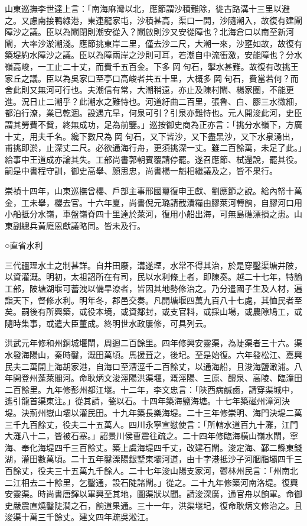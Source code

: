 山東巡撫李世達上言：「南海麻灣以北，應節謂沙積難除，徙古路溝十三里以避之。又慮南接鴨綠港，東連龍家屯，沙積甚高，渠口一開，沙隨潮入，故復有建閘障沙之議。臣以為閘閉則潮安從入？閘啟則沙又安從障也？北海倉口以南至新河閘，大率沙淤潮淺。應節挑東岸二里，僅去沙二尺，大潮一來，沙壅如故，故復有築堤約水障沙之議。臣以為障兩岸之沙則可耳，若潮自中流衝激，安能障也？分水嶺高峻，一工止二十丈，而費千五百金。下多岡句石，掣水甚難。故復有改挑王家丘之議。臣以為吳家口至亭口高峻者共五十里，大概多岡句石，費當若何？而舍此則又無河可行也。夫潮信有常，大潮稍遠，亦止及陳村閘、楊家圈，不能更進。況日止二潮乎？此潮水之難恃也。河道紆曲二百里，張魯、白、膠三水微細，都泊行潦，業已乾涸。設遇亢旱，何泉可引？引泉亦難恃也。元人開浚此河，史臣謂其勞費不貲，終無成功，足為前鑒。」巡按御史商為正亦言：「挑分水嶺下，方廣十丈，用夫千名。纔下數尺為岡句石，又下皆沙，又下盡黑沙，又下水泉湧出，甫挑即淤，止深丈二尺。必欲通海行舟，更須挑深一丈。雖二百餘萬，未足了此。」給事中王道成亦論其失。工部尚書郭朝賓覆請停罷。遂召應節、栻還說，罷其役。嗣是中書程守訓，御史高舉、顏思忠，尚書楊一魁相繼議及之，皆不果行。

崇禎十四年，山東巡撫曾櫻、戶部主事邢國璽復申王獻、劉應節之說。給內帑十萬金，工未舉，櫻去官。十六年夏，尚書倪元璐請截漬糧由膠萊河轉餉，自膠河口用小船抵分水嶺，車盤嶺脊四十里達於萊河，復用小船出海，可無島礁漂損之患。山東副總兵黃廕恩獻議略同。皆未及行。


○直省水利

三代疆理水土之制甚詳。自井田廢，溝遂堙，水常不得其治，於是穿鑿渠塘井陂，以資灌溉。明初，太祖詔所在有司，民以水利條上者，即陳奏。越二十七年，特諭工部，陂塘湖堰可蓄洩以備旱潦者，皆因其地勢修治之。乃分遣國子生及人材，遍詣天下，督修水利。明年冬，郡邑交奏。凡開塘堰四萬九百八十七處，其恤民者至矣。嗣後有所興築，或役本境，或資鄰封，或支官料，或採山場，或農隙鳩工，或隨時集事，或遣大臣董成。終明世水政屢修，可具列云。

洪武元年修和州銅城堰閘，周迴二百餘里。四年修興安靈渠，為陡渠者三十六。渠水發海陽山，秦時鑿，溉田萬頃。馬援葺之，後圮。至是始復。六年發松江、嘉興民夫二萬開上海胡家港，自海口至漕涇千二百餘丈，以通海船，且浚海鹽澉浦。八年開登州蓬萊閣河。命耿炳文浚涇陽洪渠堰，溉涇陽、三原、醴泉、高陵、臨潼田二百餘里。九年修彭州都江堰。十二年，李文忠言：「陜西病鹹鹵，請穿渠城中，遙引龍首渠東注。」從其請，甃以石。十四年築海鹽海塘。十七年築磁州漳河決堤。決荊州嶽山壩以灌民田。十九年築長樂海堤。二十三年修崇明、海門決堤二萬三千九百餘丈，役夫二十五萬人。四川永寧宣慰使言：「所轄水道百九十灘，江門大灘八十二，皆被石塞。」詔景川侯曹震往疏之。二十四年修臨海橫山嶺水閘，寧海、奉化海堤四千三百餘丈。築上虞海堤四千丈，改建石閘。浚定海、鄞二縣東錢湖，灌田數萬頃。二十五年鑿溧陽銀墅東壩河道，由十字港抵沙子河胭脂壩四千三百餘丈，役夫三十五萬九千餘人。二十七年浚山陽支家河，鬱林州民言：「州南北二江相去二十餘里，乞鑿通，設石陡諸閘。」從之。二十九年修築河南洛堤。復興安靈渠。時尚書唐鐸以軍興至其地，圖渠狀以聞。請浚深廣，通官舟以餉軍。命御史嚴震直燒鑿陡澗之石，餉道果通。三十一年，洪渠堰圮，復命耿炳文修治之。且浚渠十萬三千餘丈。建文四年疏吳淞江。

